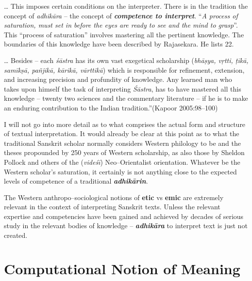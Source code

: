 \begin{myquote}
… This imposes certain conditions on the interpreter. There is in the tradition the concept of \textit{adhikāra} – the concept of \textbf{\textit{competence to interpret}}. “\textit{A process of saturation, must set in before the eyes are ready to see and the mind to grasp}”. This “process of saturation” involves mastering all the pertinent knowledge. The boundaries of this knowledge have been described by Rajasekara. He lists 22.
\end{myquote}

\begin{myquote}
… Besides – each \textit{śāstra} has its own vast exegetical scholarship (\textit{bhāṣya, vṛtti, ṭīkā, samīkṣā, pañjikā, kārikā, vārttikā}) which is responsible for refinement, extension, and increasing precision and profundity of knowledge. Any learned man who takes upon himself the task of interpreting \textit{Śāstra}, has to have mastered all this knowledge – twenty two sciences and the commentary literature – if he is to make an enduring contribution to the Indian tradition.”\hfill (Kapoor 2005:98–100)
\end{myquote}

I will not go into more detail as to what comprises the actual form and structure of textual interpretation. It would already be clear at this point as to what the traditional Sanskrit scholar normally considers Western philology to be and the theses propounded by 250 years of Western scholarship, as also those by Sheldon Pollock and others of the (\textit{videśī}) Neo–Orientalist orientation. Whatever be the Western scholar’s saturation, it certainly is not anything close to the expected levels of competence of a traditional \textbf{\textit{adhikārin}}.

The Western anthropo–sociological notions of \textbf{etic} vs \textbf{emic} are extremely relevant in the context of interpreting Sanskrit texts. Unless the relevant expertise and competencies have been gained and achieved by decades of serious study in the relevant bodies of knowledge – \textbf{\textit{adhikāra}} to interpret text is just not created.


\section*{Computational Notion of Meaning}

\vskip -6.5pt

